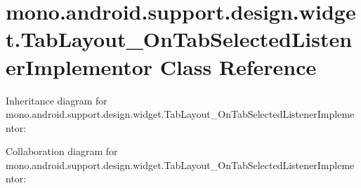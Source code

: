 \hypertarget{classmono_1_1android_1_1support_1_1design_1_1widget_1_1_tab_layout___on_tab_selected_listener_implementor}{}\section{mono.\+android.\+support.\+design.\+widget.\+Tab\+Layout\+\_\+\+On\+Tab\+Selected\+Listener\+Implementor Class Reference}
\label{classmono_1_1android_1_1support_1_1design_1_1widget_1_1_tab_layout___on_tab_selected_listener_implementor}


Inheritance diagram for mono.\+android.\+support.\+design.\+widget.\+Tab\+Layout\+\_\+\+On\+Tab\+Selected\+Listener\+Implementor\+:


Collaboration diagram for mono.\+android.\+support.\+design.\+widget.\+Tab\+Layout\+\_\+\+On\+Tab\+Selected\+Listener\+Implementor\+:
